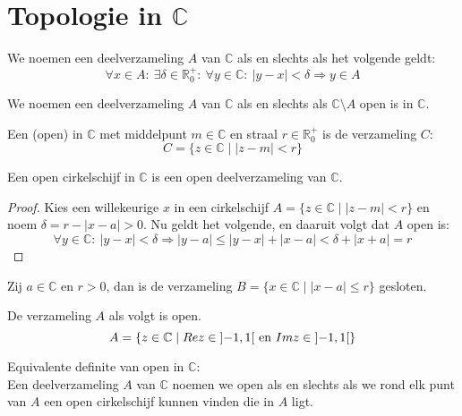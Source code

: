 \documentclass[main.tex]{subfiles}
\begin{document}
 
\section{Topologie in $\mathbb{C}$}
\label{sec:topologie-in-c}

\begin{de}
  We noemen een deelverzameling $A$ van $\mathbb{C}$  als en slechts als het volgende geldt:
  \[ \forall x\in A:\ \exists \delta \in \mathbb{R}_{0}^{+}:\ \forall y\in \mathbb{C}:\ |y-x| < \delta \Rightarrow y \in A \]
\end{de}

\begin{de}
  We noemen een deelverzameling $A$ van $\mathbb{C}$  als en slechts als $\mathbb{C} \setminus A$ open is in $\mathbb{C}$.
\end{de}

\begin{de}
  Een (open)  in $\mathbb{C}$ met middelpunt $m\in \mathbb{C}$ en straal $r\in \mathbb{R}_{0}^{+}$ is de verzameling $C$:
  \[ C = \{ z \in \mathbb{C} \mid |z-m| < r \} \]
\end{de}

\begin{st}
  Een open cirkelschijf in $\mathbb{C}$ is een open deelverzameling van $\mathbb{C}$.

  \begin{proof}
    Kies een willekeurige $x$ in een cirkelschijf $A = \{ z \in \mathbb{C} \mid |z-m| < r \}$ en noem $\delta = r-|x-a| > 0$.
    Nu geldt het volgende, en daaruit volgt dat $A$ open is:
    \[ \forall y\in \mathbb{C}:\ |y-x|<\delta \Rightarrow |y-a| \le |y-x|+|x-a| < \delta + |x+a| = r \]
  \end{proof}
\end{st}

\begin{vb}
  Zij $a\in \mathbb{C}$ en $r>0$, dan is de verzameling $B = \{x\in \mathbb{C}\mid |x-a|\le r\}$ gesloten.

\end{vb}

\begin{vb}
  De verzameling $A$ als volgt is open.
  \[ A = \left\{z \in \mathbb{C} \mid Re z \in \interval[open]{-1}{1} \text{ en } Im z \in \interval[open]{-1}{1} \right\} \]

\end{vb}

\begin{st}
  Equivalente definite van open in $\mathbb{C}$:\\
  Een deelverzameling $A$ van $\mathbb{C}$ noemen we open als en slechts als we rond elk punt van $A$ een open cirkelschijf kunnen vinden die in $A$ ligt.
\end{st}

\end{document}
